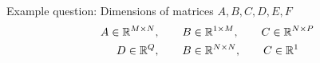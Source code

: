 

\newcommand{\ExerciseNumber}{01}

\newcommand{\PersonOne}{Marcel Bruckner}
\newcommand{\PersonTwo}{Julian Hohenadel}
\newcommand{\PersonThree}{Kevin Bein}






%
%
Example question: Dimensions of matrices $A, B, C, D, E, F$
%
\begin{align}
	A \in \mathbb{R}^{M \times N}, \qquad B &\in \mathbb{R}^{1 \times M}, \qquad C \in \mathbb{R}^{N \times P}\\
	D \in \mathbb{R}^{Q}, \qquad B &\in \mathbb{R}^{N \times N}, \qquad C \in \mathbb{R}^{1}
\end{align}%
%



